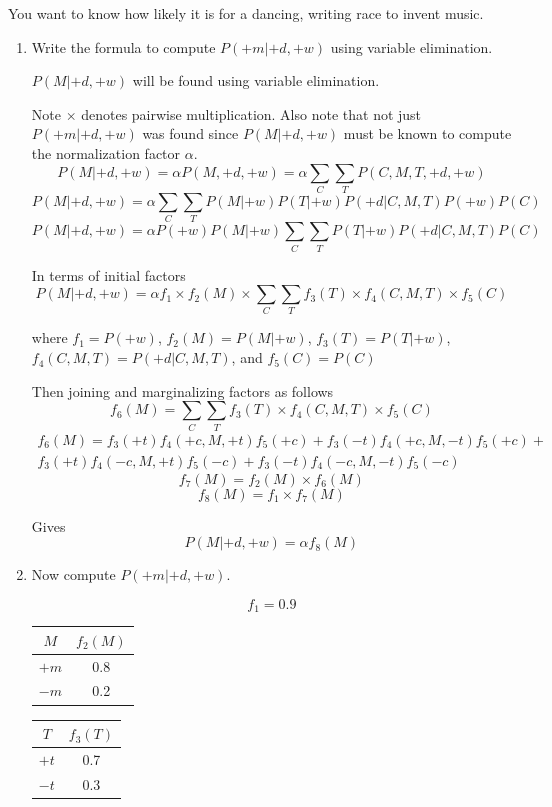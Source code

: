 \documentclass[12pt]{article}
\begin{document}
\noindent
You want to know how likely it is for a dancing, writing race to
invent music.

\begin{enumerate}

\item Write the formula to compute $P(+m | +d, +w)$ using variable elimination.

$P(M|+d,+w)$ will be found using variable elimination. 

Note $\times$ denotes pairwise multiplication.
Also note that not just $P(+m|+d,+w)$ was found since $P(M|+d,+w)$ must be known to compute the normalization factor $\alpha$.
\[
  P(M|+d,+w) = \alpha P(M,+d,+w) = \alpha \sum_C \sum_T P(C,M,T,+d,+w)
\]
\[
  P(M|+d,+w) = \alpha \sum_C \sum_T P(M|+w) P(T|+w) P(+d|C,M,T) P(+w) P(C)
\]
\[
  P(M|+d,+w) = \alpha P(+w) P(M|+w) \sum_C \sum_T P(T|+w) P(+d|C,M,T) P(C)
\]

In terms of initial factors
\[
  P(M|+d,+w) = \alpha f_1 \times f_2(M) \times \sum_C \sum_T f_3(T) \times f_4(C,M,T) \times f_5(C)
\]

where $f_1 = P(+w)$, $f_2(M) = P(M|+w)$, $f_3(T) = P(T|+w)$, $f_4(C,M,T) = P(+d|C,M,T)$, and $f_5(C) = P(C)$ 

Then joining and marginalizing factors as follows 
\[
  f_6(M) = \sum_C \sum_T f_3(T) \times f_4(C,M,T) \times f_5(C)
\]
\begin{gather}
  f_6(M) = f_3(+t) f_4(+c,M,+t) f_5(+c) + f_3(-t) f_4(+c,M,-t) f_5(+c) + \\
  f_3(+t) f_4(-c,M,+t) f_5(-c) + f_3(-t) f_4(-c,M,-t) f_5(-c)
\end{gather}
\[
  f_7(M) = f_2(M) \times f_6(M)
\]
\[
  f_8(M) = f_1 \times f_7(M)
\]

Gives
\[
  P(M|+d,+w) = \alpha f_8(M)
\]


\item Now compute $P(+m | +d, +w)$.

\[
  f_1 = 0.9
\]

\begin{center}
  \begin{tabular}{|c|c|}
    \hline
    $M$ & $f_2(M)$ \\
    \hline
    $+m$ & 0.8 \\
    \hline
    $-m$ & 0.2 \\
    \hline
  \end{tabular}

  \begin{tabular}{|c|c|}
    \hline
    $T$ & $f_3(T)$ \\
    \hline
    $+t$ & 0.7 \\
    \hline
    $-t$ & 0.3 \\
    \hline
  \end{tabular}


\end{center}
\end{enumerate}
\end{document}

